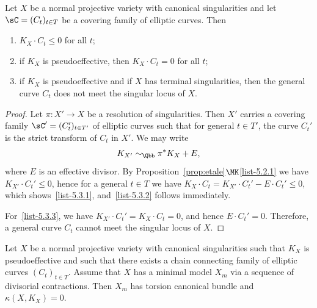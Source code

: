 \begin{coro}\label{cor:can}
Let $X$ be a normal projective variety with canonical singularities and let $\sC = (C_t)_{t\in T} $ be a covering family of elliptic curves. Then
\begin{enumerate}\romanenumi
\item \label{list-5.3.1}$K_X \cdot C_t \leq 0$ for all $t$;
\item \label{list-5.3.2}if $K_X$ is pseudoeffective, then $K_X \cdot C_t = 0$ for all $t$;
\item \label{list-5.3.3}if $K_X$ is pseudoeffective and if $X$ has terminal singularities, then the general curve $C_t$ does not meet the singular locus of $X$.
\end{enumerate}
\end{coro}

\begin{proof}
Let $\pi\colon X' \to X$ be a resolution of singularities. Then $X'$ carries a covering family $\sC' = (C_t')_{t\in {T'}} $ of elliptic curves such that for general $t\in T'$, the curve $C_t'$ is the strict transform of $C_t$ in $X'$. We may write
\[
K_{X'} \sim_\Qbb \pi^*K_X + E,
\]
where $E$ is an effective divisor. By Proposition~\ref{prop:etale}$\MK$\eqref{list-5.2.1} we have $K_{X'} \cdot C_t' \leq 0$, hence for a general $t\in T$ we have $K_X \cdot C_t = K_{X'} \cdot C_t' - E \cdot C_t'\leq 0$, which shows~\eqref{list-5.3.1}, and~\eqref{list-5.3.2} follows immediately.

For~\eqref{list-5.3.3}, we have $K_{X'}\cdot C_t'=K_X \cdot C_t = 0$, and hence $E \cdot C_t' = 0$. Therefore, a general curve $C_t$ cannot meet the singular locus of $X$.
\end{proof}

\begin{theo}\label{thm:ecc1a}
Let $X$ be a normal projective variety with canonical singularities such that $K_X$ is pseudoeffective and such that there exists a chain connecting family of elliptic curves $(C_t)_{t\in T}$. Assume that $X$ has a minimal model $X_m$ via a sequence of divisorial contractions. Then $X_m$ has torsion canonical bundle and $\kappa(X,K_X)= 0$.
\end{theo}

